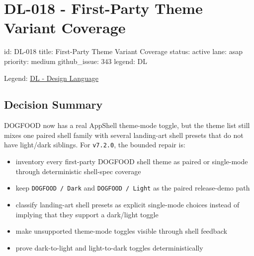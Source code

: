 \chapter{DL-018 - First-Party Theme Variant Coverage}\label{record-183}

\smallskip

\begin{RecordMeta}
id: DL-018
title: First-Party Theme Variant Coverage
status: active
lane: asap
priority: medium
github_issue: 343
legend: DL

\end{RecordMeta}

Legend: \href{https://github.com/flyingrobots/bijou/blob/1853ad902f6bf219326409e7f743a5a1d6517dbc/docs/legends/DL-design-language.md}{DL - Design Language}

\section{Decision Summary}\label{record-183-decision-summary}

DOGFOOD now has a real AppShell theme-mode toggle, but the theme list still mixes one paired shell family with several landing-art shell presets that do not have light/dark siblings. For \texttt{v\allowbreak{}7\allowbreak{}.\allowbreak{}2\allowbreak{}.\allowbreak{}0}, the bounded repair is:

\begin{itemize}
\tightlist
\item
  inventory every first-party DOGFOOD shell theme as paired or single-mode through deterministic shell-spec coverage
\item
  keep \texttt{D\allowbreak{}O\allowbreak{}G\allowbreak{}F\allowbreak{}O\allowbreak{}O\allowbreak{}D\allowbreak{} \allowbreak{}/\allowbreak{} \allowbreak{}D\allowbreak{}a\allowbreak{}r\allowbreak{}k} and \texttt{D\allowbreak{}O\allowbreak{}G\allowbreak{}F\allowbreak{}O\allowbreak{}O\allowbreak{}D\allowbreak{} \allowbreak{}/\allowbreak{} \allowbreak{}L\allowbreak{}i\allowbreak{}g\allowbreak{}h\allowbreak{}t} as the paired release-demo path
\item
  classify landing-art shell presets as explicit single-mode choices instead of implying that they support a dark/light toggle
\item
  make unsupported theme-mode toggles visible through shell feedback
\item
  prove dark-to-light and light-to-dark toggles deterministically
\end{itemize}

